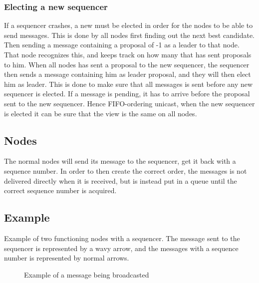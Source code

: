 \documentclass{article}
\begin{document}
 \subsubsection{Electing a new sequencer}
 If a sequencer crashes, a new must be elected in order for the nodes to be able to send
 messages. This is done by all nodes first finding out the next best candidate. Then sending
 a message containing a proposal of -1 as a leader to that node. That node recognizes this,
 and keeps track on how many that has sent proposals to him. When all nodes has sent a proposal
 to the new sequencer, the sequencer then sends a message containing him as leader proposal, 
 and they will then elect him as leader. This is done to make sure that all messages is sent 
 before any new sequencer is elected. If a message is pending, it has to arrive before the 
 proposal sent to the new sequencer. Hence FIFO-ordering unicast, when the new sequencer is 
 elected it can be sure that the view is the same on all nodes.
 \subsection{Nodes}
 The normal nodes will send its message to the sequencer, get it back with a sequence number.
 In order to then create the correct order, the messages is not delivered directly when
 it is received, but is instead put in a queue until the correct sequence number is acquired.\\
 \subsection{Example}
 Example of two functioning nodes with a sequencer. The message sent to the sequencer is 
 represented by a wavy arrow, and the messages with a sequence number is represented by normal
 arrows.
  \begin{figure}[h]
    \centering
    \caption{Example of a message being broadcasted}
    \label{fig1}
  \end{figure}
  
\end{document}
